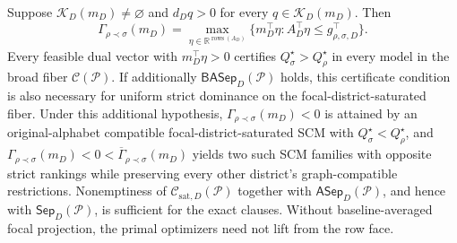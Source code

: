 Suppose \(\mathcal K_D(m_D)\ne\varnothing\) and \(d_Dq>0\) for every \(q\in\mathcal K_D(m_D)\). Then
\[
\Gamma_{\rho\prec\sigma}(m_D)=
\max_{\eta\in\mathbb R^{\operatorname{rows}(A_D)}}
\{m_D^\top\eta:A_D^\top\eta\le g_{\rho,\sigma,D}^\top\}.
\]
Every feasible dual vector with \(m_D^\top\eta>0\) certifies \(Q_\sigma^\star>Q_\rho^\star\) in every model in the broad fiber \(\mathcal C(\mathcal P)\). If additionally \(\mathsf{BASep}_D(\mathcal P)\) holds, this certificate condition is also necessary for uniform strict dominance on the focal-district-saturated fiber. Under this additional hypothesis, \(\Gamma_{\rho\prec\sigma}(m_D)<0\) is attained by an original-alphabet compatible focal-district-saturated SCM with \(Q_\sigma^\star<Q_\rho^\star\), and \(\Gamma_{\rho\prec\sigma}(m_D)<0<\overline\Gamma_{\rho\prec\sigma}(m_D)\) yields two such SCM families with opposite strict rankings while preserving every other district's graph-compatible restrictions. Nonemptiness of \(\mathcal C_{\mathrm{sat},D}(\mathcal P)\) together with \(\mathsf{ASep}_D(\mathcal P)\), and hence with \(\mathsf{Sep}_D(\mathcal P)\), is sufficient for the exact clauses. Without baseline-averaged focal projection, the primal optimizers need not lift from the row face.